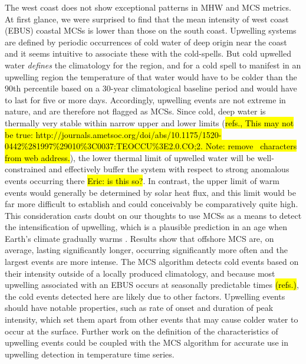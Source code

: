 \documentclass[a4paper,10pt,review]{elsarticle}
\begin{document}
The west coast does not show exceptional patterns in MHW and MCS metrics. At first glance, we were surprised to find that the mean intensity of west coast (EBUS) coastal MCSs is lower than those on the south coast. Upwelling systems are defined by periodic occurrences of cold water of deep origin near the coast \citep{Lutjeharms2000, Hutchings2009} and it seems intuitive to associate these with the cold-spells. But cold upwelled water \emph{defines} the climatology for the region, and for a cold spell to manifest in an upwelling region the temperature of that water would have to be colder than the 90th percentile based on a 30-year climatological baseline period and would have to last for five or more days. Accordingly, upwelling events are not extreme in nature, and are therefore not flagged as MCSs. Since cold, deep water is thermally very stable within narrow upper and lower limits (\hl{refs., This may not be true: http://journals.ametsoc.org/doi/abs/10.1175/1520-0442\%281997\%29010\%3C0037:TEOCCU\%3E2.0.CO;2. Note: remove \ characters from web address.}), the lower thermal limit of upwelled water will be well-constrained and effectively buffer the system with respect to strong anomalous events occurring there \hl{Eric: is this so?}. In contrast, the upper limit of warm events would generally be determined by solar heat flux, and this limit would be far more difficult to establish and could conceivably be comparatively quite high. This consideration casts doubt on our thoughts to use MCSs as a means to detect the intensification of upwelling, which is a plausible prediction in an age when Earth's climate gradually warms \citep{Garcia-Reyes2015}. Results show that offshore MCS are, on average, lasting significantly longer, occurring significantly more often and the largest events are more intense. The MCS algorithm detects cold events based on their intensity outside of a locally produced climatology, and because most upwelling associated with an EBUS occurs at seasonally predictable times \hl{(refs.)}, the cold events detected here are likely due to other factors. Upwelling events should have notable properties, such as rate of onset and duration of peak intensity, which set them apart from other events that may cause colder water to occur at the surface. Further work on the definition of the characteristics of upwelling events could be coupled with the MCS algorithm for accurate use in upwelling detection in temperature time series.
\end{document}
